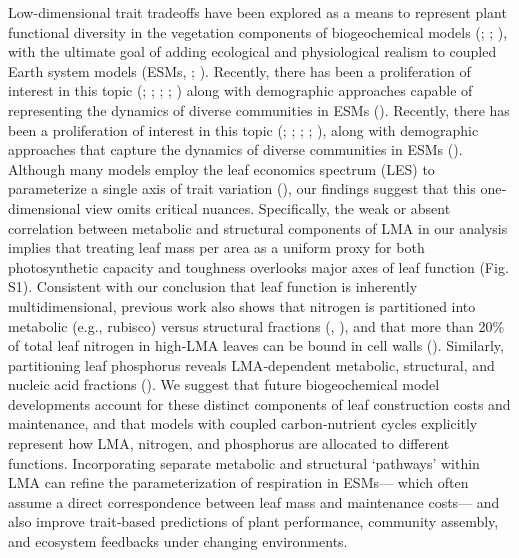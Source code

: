 \documentclass[
  12pt,
  letterpaper,
  DIV=11,
  numbers=noendperiod]{scrartcl}
\begin{document}
Low-dimensional trait tradeoffs have been explored as a means to
represent plant functional diversity in the vegetation components of
biogeochemical models (; ;
), with the ultimate
goal of adding ecological and physiological realism to coupled Earth
system models (ESMs, ;
). Recently,
there has been a proliferation of interest in this topic
(;
;
;
;
) along
with demographic approaches capable of representing the dynamics of
diverse communities in ESMs (). Recently, there has been a proliferation of interest in this
topic (;
;
;
;
), along
with demographic approaches that capture the dynamics of diverse
communities in ESMs ().
Although many models employ the leaf economics spectrum (LES) to
parameterize a single axis of trait variation
(), our findings suggest
that this one‐dimensional view omits critical nuances. Specifically, the
weak or absent correlation between metabolic and structural components
of LMA in our analysis implies that treating leaf mass per area as a
uniform proxy for both photosynthetic capacity and toughness overlooks
major axes of leaf function (Fig. S1). Consistent with our conclusion
that leaf function is inherently multidimensional, previous work also
shows that nitrogen is partitioned into metabolic (e.g., rubisco) versus
structural fractions (,
), and that more than 20\% of total leaf
nitrogen in high‐LMA leaves can be bound in cell walls
(). Similarly, partitioning
leaf phosphorus reveals LMA‐dependent metabolic, structural, and nucleic
acid fractions ().
We suggest that future biogeochemical model developments account for
these distinct components of leaf construction costs and maintenance,
and that models with coupled carbon‐nutrient cycles explicitly represent
how LMA, nitrogen, and phosphorus are allocated to different functions.
Incorporating separate metabolic and structural `pathways' within LMA
can refine the parameterization of respiration in ESMs--- which often
assume a direct correspondence between leaf mass and maintenance
costs--- and also improve trait‐based predictions of plant performance,
community assembly, and ecosystem feedbacks under changing environments.
\end{document}
